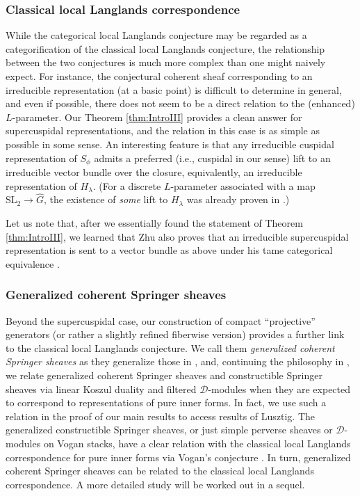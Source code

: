 \documentclass{amsart}
\theoremstyle{definition}
\theoremstyle{remark}
\numberwithin{equation}{section}
\newcommand{\mc}{\mathcal}
\newcommand{\SL}{\mathrm{SL}}
\newcommand{\wh}{\widehat}
\begin{document}
\subsubsection{Classical local Langlands correspondence}
While the categorical local Langlands conjecture may be regarded as a categorification of the classical local Langlands conjecture, the relationship between the two conjectures is much more complex than one might naively expect. For instance, the conjectural coherent sheaf corresponding to an irreducible representation (at a basic point) is difficult to determine in general, and even if possible, there does not seem to be a direct relation to the (enhanced) $L$-parameter. Our Theorem \ref{thm:IntroIII} provides a clean answer for supercuspidal representations, and the relation in this case is as simple as possible in some sense. An interesting feature is that any irreducible cuspidal representation of $S_\phi$ admits a preferred (i.e., cuspidal in our sense) lift to an irreducible vector bundle over the closure, equivalently, an irreducible representation of $H_\lambda$. (For a discrete $L$-parameter associated with a map $\SL_2\to \wh G$, the existence of \emph{some} lift to $H_\lambda$ was already proven in \cite[Theorem 1.1]{Sommers}.)

Let us note that, after we essentially found the statement of Theorem \ref{thm:IntroIII}, we learned that Zhu also proves that an irreducible supercuspidal representation is sent to a vector bundle as above under his tame categorical equivalence \cite{ZhuTame}. 

\subsubsection{Generalized coherent Springer sheaves}
Beyond the supercuspidal case, our construction of compact ``projective'' generators (or rather a slightly refined fiberwise version) provides a further link to the classical local Langlands conjecture. We call them \emph{generalized coherent Springer sheaves} as they generalize those in \cite{BCHNspringer}, and, continuing the philosophy in \cite{BCHNconstructible}, we relate generalized coherent Springer sheaves and constructible Springer sheaves via linear Koszul duality and filtered $\mc D$-modules when they are expected to correspond to representations of pure inner forms. In fact, we use such a relation in the proof of our main results to access results of Lusztig. The generalized constructible Springer sheaves, or just simple perverse sheaves or $\mc D$-modules on Vogan stacks, have a clear relation with the classical local Langlands correspondence for pure inner forms via Vogan's conjecture \cite{VoganLLC}. In turn, generalized coherent Springer sheaves can be related to the classical local Langlands correspondence. A more detailed study will be worked out in a sequel. 
\end{document}
